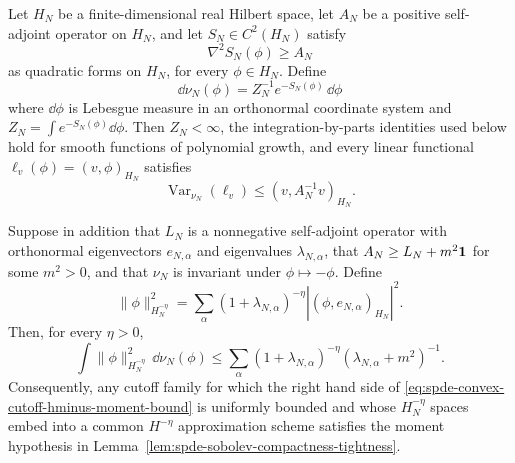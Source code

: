 \begin{proposition}
\label{prop:spde-brascamp-lieb-convex-cutoff-moment}
Let \(H_N\) be a finite-dimensional real Hilbert space, let \(A_N\) be a
positive self-adjoint operator on \(H_N\), and let \(S_N\in C^2(H_N)\)
satisfy
\begin{equation}
  \nabla^2S_N(\phi)\geq A_N
  \label{eq:spde-brascamp-lieb-hessian-lower-bound}
\end{equation}
as quadratic forms on \(H_N\), for every \(\phi\in H_N\).  Define
\[
  \dd\nu_N(\phi)=Z_N^{-1}e^{-S_N(\phi)}\,\dd\phi
\]
where \(\dd\phi\) is Lebesgue measure in an orthonormal coordinate system
and \(Z_N=\int e^{-S_N(\phi)}\dd\phi\).  Then \(Z_N<\infty\), the
integration-by-parts identities used below hold for smooth functions of
polynomial growth, and every linear functional
\(\ell_v(\phi)=(v,\phi)_{H_N}\) satisfies
\begin{equation}
  \operatorname{Var}_{\nu_N}(\ell_v)
  \leq
  (v,A_N^{-1}v)_{H_N}.
  \label{eq:spde-brascamp-lieb-linear-covariance}
\end{equation}

Suppose in addition that \(L_N\) is a nonnegative self-adjoint operator with
orthonormal eigenvectors \(e_{N,\alpha}\) and eigenvalues
\(\lambda_{N,\alpha}\), that \(A_N\geq L_N+m^2{\bf 1}\) for some \(m^2>0\),
and that \(\nu_N\) is invariant under \(\phi\mapsto-\phi\).  Define
\begin{equation}
  \|\phi\|_{H_N^{-\eta}}^2
  =
  \sum_\alpha
  (1+\lambda_{N,\alpha})^{-\eta}
  |(\phi,e_{N,\alpha})_{H_N}|^2 .
  \label{eq:spde-discrete-negative-sobolev-norm}
\end{equation}
Then, for every \(\eta>0\),
\begin{equation}
  \int\|\phi\|_{H_N^{-\eta}}^2\,\dd\nu_N(\phi)
  \leq
  \sum_\alpha
  (1+\lambda_{N,\alpha})^{-\eta}
  (\lambda_{N,\alpha}+m^2)^{-1}.
  \label{eq:spde-convex-cutoff-hminus-moment-bound}
\end{equation}
Consequently, any cutoff family for which the right hand side of
\eqref{eq:spde-convex-cutoff-hminus-moment-bound} is uniformly bounded and
whose \(H_N^{-\eta}\) spaces embed into a common \(H^{-\eta}\) approximation
scheme satisfies the moment hypothesis in
Lemma~\ref{lem:spde-sobolev-compactness-tightness}.
\end{proposition}

